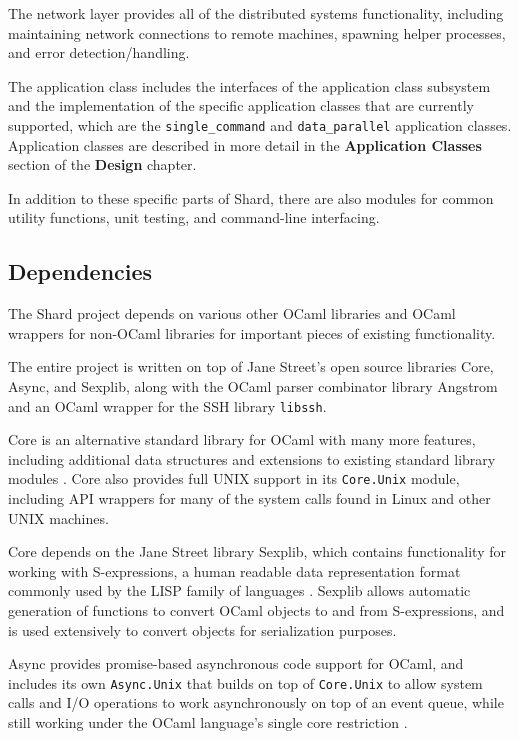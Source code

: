 \documentclass[oneside]{report}
\newcommand{\todoi}[1]{\todo[inline, color=blue!20]{TODO: {#1}}}
\begin{document}
The network layer provides all of the distributed systems functionality, including maintaining network connections to remote machines, spawning helper processes, and error detection/handling.

\begin{sloppypar}
  The application class includes the interfaces of the application class subsystem and the implementation of the specific application classes that are currently supported, which are the \texttt{single\_command} and \texttt{data\_parallel} application classes. Application classes are described in more detail in the \textbf{Application Classes} section of the \textbf{Design} chapter.
\end{sloppypar}


In addition to these specific parts of Shard, there are also modules for common utility functions, unit testing, and command-line interfacing.

\subsection{Dependencies}
The Shard project depends on various other OCaml libraries and OCaml wrappers for non-OCaml libraries for important pieces of existing functionality.

The entire project is written on top of Jane Street's open source libraries Core, Async, and Sexplib, along with the OCaml parser combinator library Angstrom and an OCaml wrapper for the SSH library \texttt{libssh}.

Core is an alternative standard library for OCaml with many more features, including additional data structures and extensions to existing standard library modules \cite{ocamlcore}.
Core also provides full UNIX support in its \texttt{Core.Unix} module, including API wrappers for many of the system calls found in Linux and other UNIX machines.

Core depends on the Jane Street library Sexplib, which contains functionality for working with S-expressions, a human readable data representation format commonly used by the LISP family of languages \cite{mccarthy1960recursive}. Sexplib allows automatic generation of functions to convert OCaml objects to and from S-expressions, and is used extensively to convert objects for serialization purposes.

Async provides promise-based asynchronous code support for OCaml, and includes its own \texttt{Async.Unix} that builds on top of \texttt{Core.Unix} to allow system calls and I/O operations to work asynchronously on top of an event queue, while still working under the OCaml language's single core restriction \cite{ocamlasync}.
\end{document}
